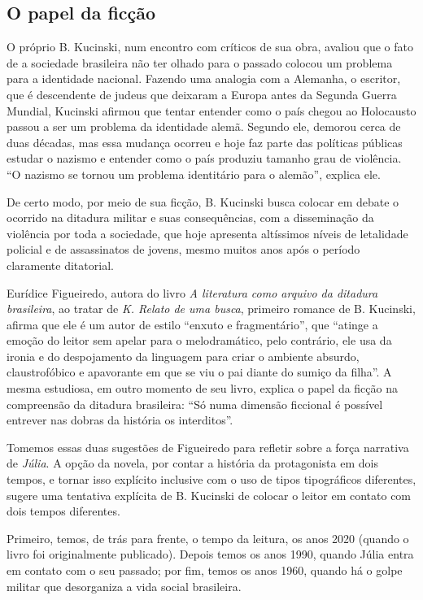 \documentclass[12pt]{extarticle}
\begin{document}
\subsection{O papel da ficção}

O próprio B. Kucinski, num encontro com críticos de sua obra, avaliou
que o fato de a sociedade brasileira não ter olhado para o passado
colocou um problema para a identidade nacional. Fazendo uma analogia com
a Alemanha, o escritor, que é descendente de judeus que deixaram a
Europa antes da Segunda Guerra Mundial, Kucinski afirmou que tentar
entender como o país chegou ao Holocausto passou a ser um problema da
identidade alemã. Segundo ele, demorou cerca de duas décadas, mas essa
mudança ocorreu e hoje faz parte das políticas públicas estudar o
nazismo e entender como o país produziu tamanho grau de violência. ``O
nazismo se tornou um problema identitário para o alemão'', explica ele.

De certo modo, por meio de sua ficção, B. Kucinski busca colocar em debate o ocorrido na ditadura militar e suas consequências, com a disseminação da
violência por toda a sociedade, que hoje apresenta altíssimos níveis de
letalidade policial e de assassinatos de jovens, mesmo muitos anos após o período
claramente ditatorial.

Eurídice Figueiredo, autora do livro \emph{A literatura como arquivo da
ditadura brasileira}, ao tratar de \emph{K. Relato de uma busca},
primeiro romance de B. Kucinski, afirma que ele é um autor de estilo
``enxuto e fragmentário'', que ``atinge a emoção do leitor sem apelar
para o melodramático, pelo contrário, ele usa da ironia e do
despojamento da linguagem para criar o ambiente absurdo, claustrofóbico
e apavorante em que se viu o pai diante do sumiço da filha''. A mesma
estudiosa, em outro momento de seu livro, explica o papel da ficção na
compreensão da ditadura brasileira: ``Só numa dimensão ficcional é
possível entrever nas dobras da história os interditos''.

Tomemos essas duas sugestões de Figueiredo para refletir sobre a força
narrativa de \emph{Júlia}. A opção da novela, por contar a história da
protagonista em dois tempos, e tornar isso explícito inclusive com o uso
de tipos tipográficos diferentes, sugere uma tentativa explícita de B.
Kucinski de colocar o leitor em contato com dois tempos diferentes.

Primeiro, temos, de trás para frente, o tempo da leitura, os anos 2020
(quando o livro foi originalmente publicado). Depois temos os anos 1990,
quando Júlia entra em contato com o seu passado; por fim, temos os anos
1960, quando há o golpe militar que desorganiza a vida social
brasileira.
\end{document}

